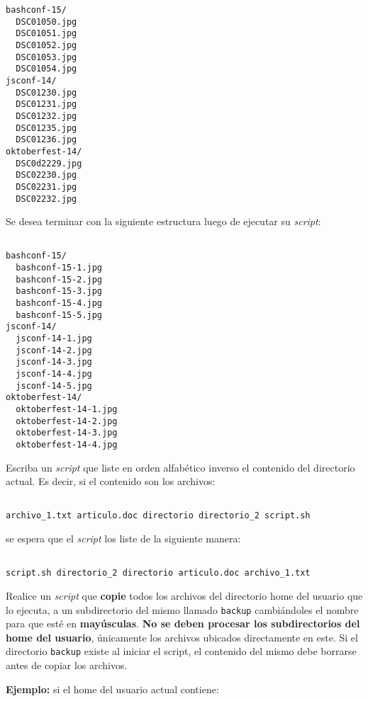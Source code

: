 \begin{questions}
\begin{lstlisting}
bashconf-15/
  DSC01050.jpg
  DSC01051.jpg
  DSC01052.jpg
  DSC01053.jpg
  DSC01054.jpg
jsconf-14/
  DSC01230.jpg
  DSC01231.jpg
  DSC01232.jpg
  DSC01235.jpg
  DSC01236.jpg
oktoberfest-14/
  DSC0d2229.jpg
  DSC02230.jpg
  DSC02231.jpg
  DSC02232.jpg

  \end{lstlisting}

  Se desea terminar con la siguiente estructura luego de ejecutar su \textit{script}:

  \begin{lstlisting}

bashconf-15/
  bashconf-15-1.jpg
  bashconf-15-2.jpg
  bashconf-15-3.jpg
  bashconf-15-4.jpg
  bashconf-15-5.jpg
jsconf-14/
  jsconf-14-1.jpg
  jsconf-14-2.jpg
  jsconf-14-3.jpg
  jsconf-14-4.jpg
  jsconf-14-5.jpg
oktoberfest-14/
  oktoberfest-14-1.jpg
  oktoberfest-14-2.jpg
  oktoberfest-14-3.jpg
  oktoberfest-14-4.jpg

  \end{lstlisting}

\question Escriba un \textit{script} que liste en orden alfabético inverso el contenido
  del directorio actual. Es decir, si el contenido son los archivos:

  \begin{lstlisting}

archivo_1.txt articulo.doc directorio directorio_2 script.sh

  \end{lstlisting}

  se espera que el \textit{script} los liste de la siguiente manera:

  \begin{lstlisting}

script.sh directorio_2 directorio articulo.doc archivo_1.txt

  \end{lstlisting}

\question Realice un \textit{script} que \textbf{copie} todos los archivos del directorio home
  del usuario que lo ejecuta, a un subdirectorio del mismo llamado \texttt{backup} cambiándoles
  el nombre para que esté en \textbf{mayúsculas}. \textbf{No se deben procesar los subdirectorios
  del home del usuario}, únicamente los archivos ubicados directamente en este. Si el directorio
  \texttt{backup} existe al iniciar el script, el contenido del mismo debe borrarse antes de
  copiar los archivos.

  \textbf{Ejemplo:} si el home del usuario actual contiene:


\end{questions}
